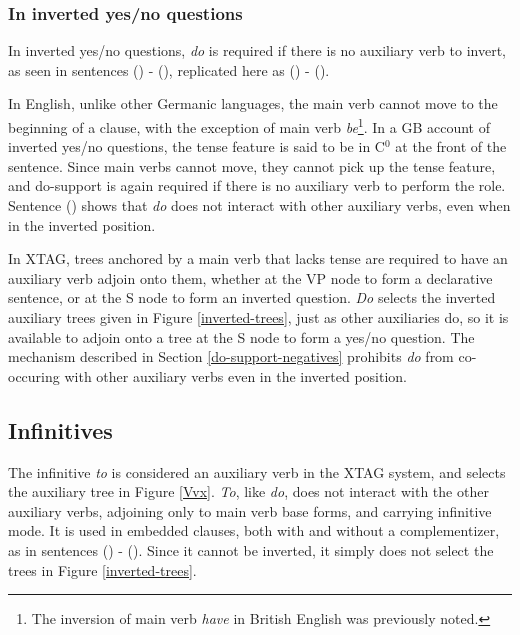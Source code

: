
\subsubsection{In inverted yes/no questions}

In inverted yes/no questions, {\it do} is required if there is no auxiliary
verb to invert, as seen in sentences () - (), replicated here
as () - ().


In English, unlike other Germanic languages, the main verb cannot move to the
beginning of a clause, with the exception of main verb {\it be}\footnote{The
inversion of main verb {\it have} in British English was previously noted.}.
In a GB account of inverted yes/no questions, the tense feature is said to be
in C$^{0}$ at the front of the sentence.  Since main verbs cannot move, they
cannot pick up the tense feature, and do-support is again required if there is
no auxiliary verb to perform the role.  Sentence () shows that {\it do}
does not interact with other auxiliary verbs, even when in the inverted
position.

In XTAG, trees anchored by a main verb that lacks tense are required to have an
auxiliary verb adjoin onto them, whether at the VP node to form a declarative
sentence, or at the S node to form an inverted question.  {\it Do} selects the
inverted auxiliary trees given in Figure \ref{inverted-trees}, just as other
auxiliaries do, so it is available to adjoin onto a tree at the S node to form
a yes/no question.  The mechanism described in Section \ref{do-support-negatives} 
prohibits {\it do} from co-occuring with other auxiliary verbs even in the
inverted position.


\subsection{Infinitives}

The infinitive {\it to} is considered an auxiliary verb in the XTAG system, and
selects the auxiliary tree in Figure \ref{Vvx}.  {\it To}, like {\it do}, does
not interact with the other auxiliary verbs, adjoining only to main verb base
forms, and carrying infinitive mode.  It is used in embedded clauses, both with
and without a complementizer, as in sentences () - ().  Since it
cannot be inverted, it simply does not select the trees in Figure
\ref{inverted-trees}.

